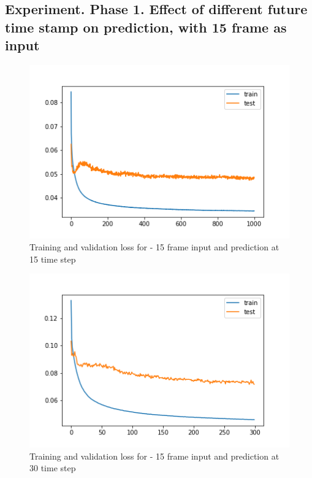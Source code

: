 \subsection{Experiment. Phase 1. Effect of different future time stamp on prediction, with 15 frame as input}
\begin{figure}[H] 
\includegraphics[scale=0.75]{conf7_1000e_15ffuture}
\begin{center}
\caption{Training and validation loss for - 15 frame input and prediction at 15 time step }
\label{fig:15-15}
\end{center}
\end{figure}

\begin{figure}[H] 
\includegraphics[scale=0.75]{conf8_300e_30ffuture}
\begin{center}
\caption{Training and validation loss for - 15 frame input and prediction at 30 time step }
\label{fig:15-30}
\end{center}
\end{figure}

